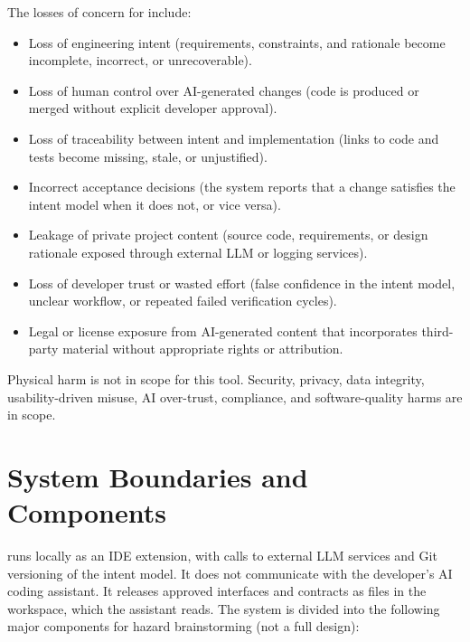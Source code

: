 \documentclass{article}
\begin{document}
The losses of concern for \progname{} include:
\begin{itemize}
  \item Loss of engineering intent (requirements, constraints, and rationale
  become incomplete, incorrect, or unrecoverable).
  \item Loss of human control over AI-generated changes (code is produced or
  merged without explicit developer approval).
  \item Loss of traceability between intent and implementation (links to code
  and tests become missing, stale, or unjustified).
  \item Incorrect acceptance decisions (the system reports that a change
  satisfies the intent model when it does not, or vice versa).
  \item Leakage of private project content (source code, requirements, or
  design rationale exposed through external LLM or logging services).
  \item Loss of developer trust or wasted effort (false confidence in the
  intent model, unclear workflow, or repeated failed verification cycles).
  \item Legal or license exposure from AI-generated content that incorporates
  third-party material without appropriate rights or attribution.
\end{itemize}

Physical harm is not in scope for this tool. Security, privacy, data integrity,
usability-driven misuse, AI over-trust, compliance, and software-quality harms
are in scope.

\section{System Boundaries and Components}

\progname{} runs locally as an IDE extension, with calls to external LLM
services and Git versioning of the intent model. It does not communicate with
the developer's AI coding assistant. It releases approved interfaces and
contracts as files in the workspace, which the assistant reads. The system is divided into the following
major components for hazard brainstorming (not a full design):
\end{document}
